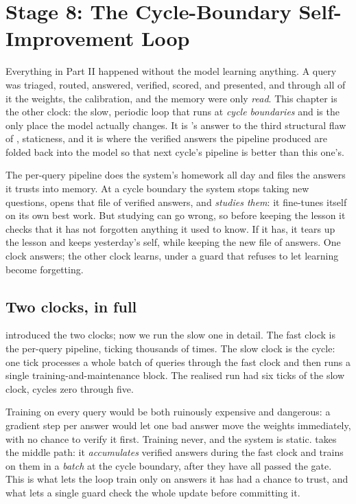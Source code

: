 \chapter{Stage 8: The Cycle-Boundary Self-Improvement Loop}
\label{ch:cycle}

Everything in Part II happened without the model learning anything. A query was
triaged, routed, answered, verified, scored, and presented, and through all of it the
weights, the calibration, and the memory were only \emph{read}. This chapter is the
other clock: the slow, periodic loop that runs at \emph{cycle boundaries} and is the
only place the model actually changes. It is \caem{}'s answer to the third structural
flaw of , staticness, and it is where the verified answers the
pipeline produced are folded back into the model so that next cycle's pipeline is
better than this one's.

\begin{intuition}
The per-query pipeline does the system's homework all day and files the answers it
trusts into memory. At a cycle boundary the system stops taking new questions, opens
that file of verified answers, and \emph{studies them}: it fine-tunes itself on its own
best work. But studying can go wrong, so before keeping the lesson it checks that it
has not forgotten anything it used to know. If it has, it tears up the lesson and keeps
yesterday's self, while keeping the new file of answers. One clock answers; the other
clock learns, under a guard that refuses to let learning become forgetting.
\end{intuition}

\section{Two clocks, in full}
\label{sec:cycle-clocks}

 introduced the two clocks; now we run the slow one in detail. The
fast clock is the per-query pipeline, ticking thousands of times. The slow clock is the
cycle: one tick processes a whole batch of queries through the fast clock and then runs
a single training-and-maintenance block. The realised run had six ticks of the slow
clock, cycles zero through five.

\begin{precise}
Training on every query would be both ruinously expensive and dangerous: a gradient
step per answer would let one bad answer move the weights immediately, with no chance
to verify it first. Training never, and the system is static. \caem{} takes the middle
path: it \emph{accumulates} verified answers during the fast clock and trains on them in
a \emph{batch} at the cycle boundary, after they have all passed the gate. This is what
lets the loop train only on answers it has had a chance to trust, and what lets a single
guard check the whole update before committing it.
\end{precise}


